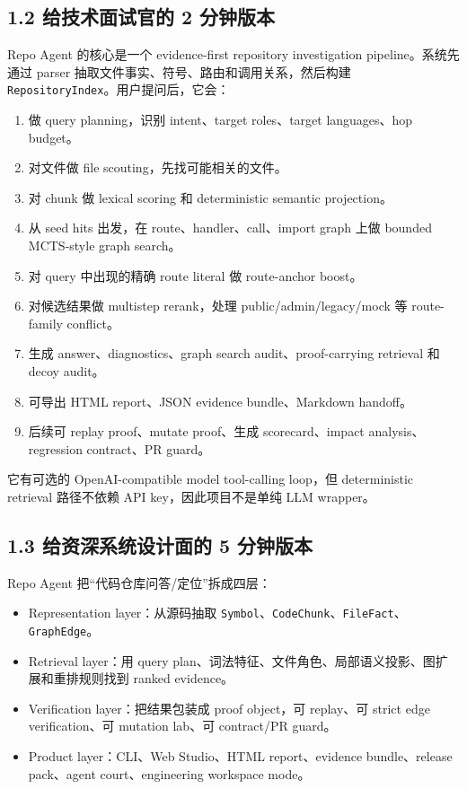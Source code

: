 \documentclass[UTF8,12pt,openany]{ctexbook}
\begin{document}
\subsection{1.2 给技术面试官的 2 分钟版本}

Repo Agent 的核心是一个 evidence-first repository investigation pipeline。系统先通过 parser 抽取文件事实、符号、路由和调用关系，然后构建 \texttt{RepositoryIndex}。用户提问后，它会：\par

\begin{enumerate}
\item 做 query planning，识别 intent、target roles、target languages、hop budget。
\item 对文件做 file scouting，先找可能相关的文件。
\item 对 chunk 做 lexical scoring 和 deterministic semantic projection。
\item 从 seed hits 出发，在 route、handler、call、import graph 上做 bounded MCTS-style graph search。
\item 对 query 中出现的精确 route literal 做 route-anchor boost。
\item 对候选结果做 multistep rerank，处理 public/admin/legacy/mock 等 route-family conflict。
\item 生成 answer、diagnostics、graph search audit、proof-carrying retrieval 和 decoy audit。
\item 可导出 HTML report、JSON evidence bundle、Markdown handoff。
\item 后续可 replay proof、mutate proof、生成 scorecard、impact analysis、regression contract、PR guard。
\end{enumerate}

它有可选的 OpenAI-compatible model tool-calling loop，但 deterministic retrieval 路径不依赖 API key，因此项目不是单纯 LLM wrapper。\par

\subsection{1.3 给资深系统设计面的 5 分钟版本}

Repo Agent 把“代码仓库问答/定位”拆成四层：\par

\begin{itemize}
\item Representation layer：从源码抽取 \texttt{Symbol}、\texttt{CodeChunk}、\texttt{FileFact}、\texttt{GraphEdge}。
\item Retrieval layer：用 query plan、词法特征、文件角色、局部语义投影、图扩展和重排规则找到 ranked evidence。
\item Verification layer：把结果包装成 proof object，可 replay、可 strict edge verification、可 mutation lab、可 contract/PR guard。
\item Product layer：CLI、Web Studio、HTML report、evidence bundle、release pack、agent court、engineering workspace mode。
\end{itemize}
\end{document}
